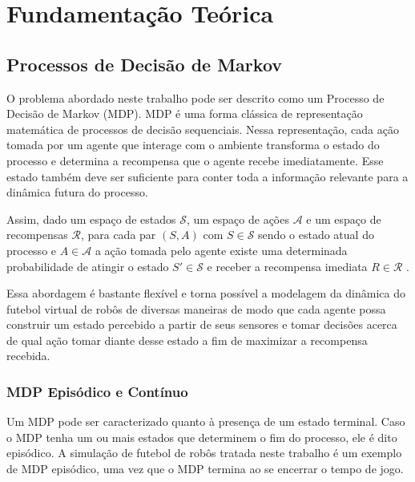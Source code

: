 \chapter{Fundamentação Teórica \label{chap:FundamentacaoMatematica}}



\section{Processos de Decisão de Markov}

O problema abordado neste trabalho pode ser descrito como um Processo de Decisão de Markov (MDP).
MDP é uma forma clássica de representação matemática de processos de decisão sequenciais.
Nessa representação, cada ação tomada por um agente que interage com o ambiente transforma o estado do processo e determina a recompensa que o agente recebe imediatamente.
Esse estado também deve ser suficiente para conter toda a informação relevante para a dinâmica futura do processo.


Assim, dado um espaço de estados $\mathcal{S}$, um espaço de ações $\mathcal{A}$ e um espaço de recompensas $\mathcal{R}$, para cada par $(S, A)$ com $S \in \mathcal{S}$ sendo o estado atual do processo e $A \in \mathcal{A}$ a ação tomada pelo agente existe uma determinada probabilidade de atingir o estado $S' \in \mathcal{S}$ e receber a recompensa imediata $R \in \mathcal{R}$ \cite{sutton2018reinforcement}.

Essa abordagem é bastante flexível e torna possível a modelagem da dinâmica do futebol virtual de robôs de diversas maneiras de modo que cada agente possa construir um estado percebido a partir de seus sensores e tomar decisões acerca de qual ação tomar diante desse estado a fim de maximizar a recompensa recebida.

\subsection{MDP Episódico e Contínuo}

Um MDP pode ser caracterizado quanto à presença de um estado terminal. Caso o MDP tenha um ou mais estados que determinem o fim do processo, ele é dito episódico. A simulação de futebol de robôs tratada neste trabalho é um exemplo de MDP episódico, uma vez que o MDP termina ao se encerrar o tempo de jogo.

